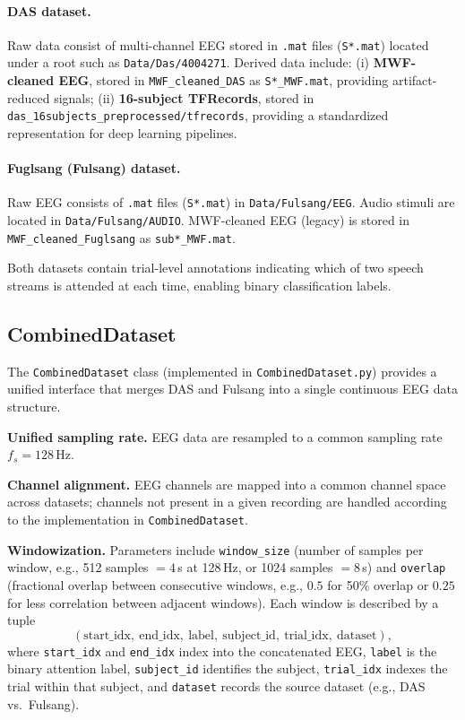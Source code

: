 \documentclass[11pt,a4paper]{article}
\newcommand{\py}[1]{\texttt{#1}}
\begin{document}
\paragraph{DAS dataset.} Raw data consist of multi-channel EEG stored in \texttt{.mat} files (\texttt{S*.mat}) located under a root such as \py{Data/Das/4004271}. Derived data include: (i) \textbf{MWF-cleaned EEG}, stored in \py{MWF\_cleaned\_DAS} as \texttt{S*\_MWF.mat}, providing artifact-reduced signals; (ii) \textbf{16-subject TFRecords}, stored in \py{das\_16subjects\_preprocessed/tfrecords}, providing a standardized representation for deep learning pipelines.

\paragraph{Fuglsang (Fulsang) dataset.} Raw EEG consists of \texttt{.mat} files (\texttt{S*.mat}) in \py{Data/Fulsang/EEG}. Audio stimuli are located in \py{Data/Fulsang/AUDIO}. MWF-cleaned EEG (legacy) is stored in \py{MWF\_cleaned\_Fuglsang} as \texttt{sub*\_MWF.mat}.

Both datasets contain trial-level annotations indicating which of two speech streams is attended at each time, enabling binary classification labels.

\subsection{CombinedDataset}
\label{sec:combineddataset}

The \py{CombinedDataset} class (implemented in \py{CombinedDataset.py}) provides a unified interface that merges DAS and Fulsang into a single continuous EEG data structure.

\textbf{Unified sampling rate.} EEG data are resampled to a common sampling rate $f_s = 128$\,Hz.

\textbf{Channel alignment.} EEG channels are mapped into a common channel space across datasets; channels not present in a given recording are handled according to the implementation in \py{CombinedDataset}.

\textbf{Windowization.} Parameters include \texttt{window\_size} (number of samples per window, e.g., 512 samples $= 4$\,s at 128\,Hz, or 1024 samples $= 8$\,s) and \texttt{overlap} (fractional overlap between consecutive windows, e.g., $0.5$ for 50\% overlap or $0.25$ for less correlation between adjacent windows). Each window is described by a tuple
\[
  (\text{start\_idx},\ \text{end\_idx},\ \text{label},\ \text{subject\_id},\ \text{trial\_idx},\ \text{dataset}),
\]
where \texttt{start\_idx} and \texttt{end\_idx} index into the concatenated EEG, \texttt{label} is the binary attention label, \texttt{subject\_id} identifies the subject, \texttt{trial\_idx} indexes the trial within that subject, and \texttt{dataset} records the source dataset (e.g., DAS vs.\ Fulsang).
\end{document}
